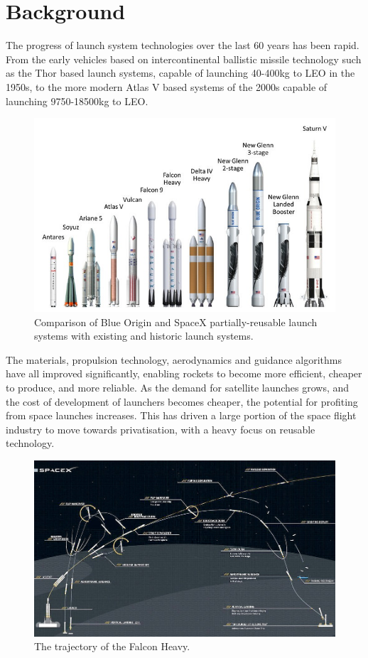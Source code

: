       \chapter{Background}
    The progress of launch system technologies over the last 60 years has been rapid. From the early vehicles based on intercontinental ballistic missile technology such as the Thor based launch systems, capable of launching 40-400kg to LEO in the 1950s, to the more modern Atlas V based systems of the 2000s capable of launching 9750-18500kg to LEO\cite{Kendall2010}. 
         \begin{figure}[ht]
         	\centering
         	\includegraphics[width=0.9\linewidth]{figures/2_literature-review/LaunchVehicles}
         	\caption{Comparison of Blue Origin and SpaceX partially-reusable launch systems with existing and historic launch systems\cite{BlueOrigin}.}
         	\label{fig:LaunchVehicles}
         \end{figure}
    The materials, propulsion technology, aerodynamics and guidance algorithms have all improved significantly, enabling  rockets to become more efficient, cheaper to produce, and more reliable. As the demand for satellite launches grows, and the cost of development of launchers becomes cheaper, the potential for profiting from space launches increases. 
    This has driven a large portion of the space flight industry to move towards privatisation, with a heavy focus on reusable technology. 
        \begin{figure}[ht]
        	\centering
        	\includegraphics[width=1\linewidth]{"figures/2_literature-review/FalconTrajectory"}
        	\caption{The trajectory of the Falcon Heavy\cite{FalconHeavy}.}
        	\label{fig:FalconTrajectory}
        \end{figure}

